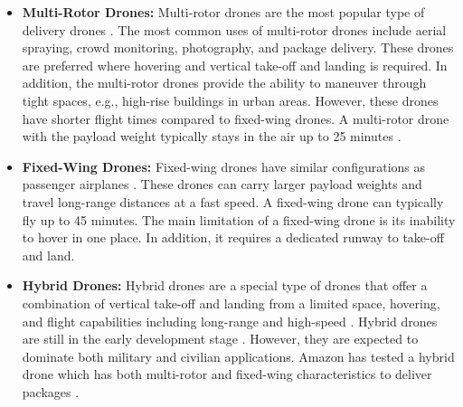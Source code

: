\documentclass[conference]{IEEEtran}
\begin{document}
\begin{itemize}[leftmargin=*]
    \item \textbf{Multi-Rotor Drones:} Multi-rotor drones are the most popular type of delivery drones \cite{yang2017multi}. The most common uses of multi-rotor drones include aerial spraying, crowd monitoring, photography, and package delivery. These drones are preferred where hovering and vertical take-off and landing is required. In addition, the multi-rotor drones provide the ability to maneuver through tight spaces, e.g., high-rise buildings in urban areas. However, these drones have shorter flight times compared to fixed-wing drones. A multi-rotor drone with the payload weight typically stays in the air up to 25 minutes \cite{10.1007/978-3-319-43506-0_44}.
    
    \item \textbf{Fixed-Wing Drones:} Fixed-wing drones have similar configurations as passenger airplanes \cite{10.1007/978-981-33-6981-8_49}. These drones can carry larger payload weights and travel long-range distances at a fast speed. A fixed-wing drone can typically fly up to 45 minutes. The main limitation of a fixed-wing drone is its inability to hover in one place. In addition, it requires a dedicated runway to take-off and land.
    \item \textbf{Hybrid Drones:} Hybrid drones are a special type of drones that offer a combination of vertical take-off and landing from a limited space, hovering, and flight capabilities including long-range and high-speed \cite{SAEED201891}. Hybrid drones are still in the early development stage \cite{goetzendorf2021lightweight}. However, they are expected to dominate both military and civilian applications. Amazon has tested a hybrid drone which has both multi-rotor and fixed-wing characteristics to deliver packages \cite{7802742}.
    
\end{itemize}
\end{document}
